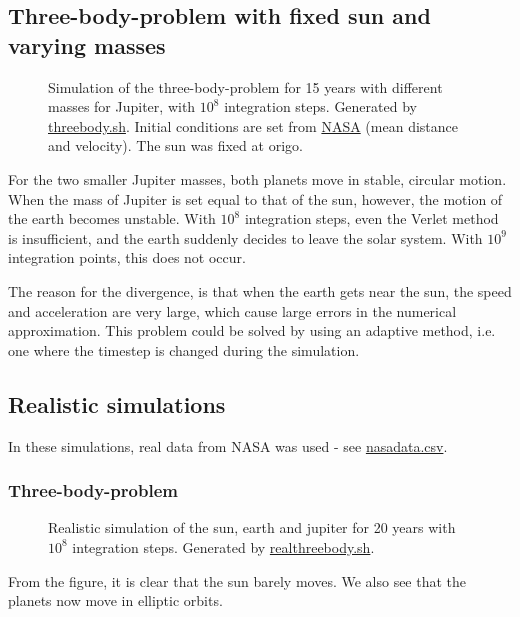 \documentclass[12pt,english,a4paper]{article}
\newcommand{\program}[1]{\href{https://github.com/anjohan/Offentlig/blob/master/FYS3150/Oblig3/#1}{#1}}
\begin{document}
\subsection{Three-body-problem with fixed sun and varying masses}
\begin{figure}[H]
\centering

\caption{Simulation of the three-body-problem for 15 years with different masses for Jupiter, with \(10^8\) integration steps. Generated by \program{threebody.sh}. Initial conditions are set from \href{http://nssdc.gsfc.nasa.gov/planetary/factsheet/jupiterfact.html}{NASA} (mean distance and velocity). The sun was fixed at origo.}
\end{figure}
For the two smaller Jupiter masses, both planets move in stable, circular motion. When the mass of Jupiter is set equal to that of the sun, however, the motion of the earth becomes unstable. With \(10^8\) integration steps, even the Verlet method is insufficient, and the earth suddenly decides to leave the solar system. With \(10^9\) integration points, this does not occur.

The reason for the divergence, is that when the earth gets near the sun, the speed and acceleration are very large, which cause large errors in the numerical approximation. This problem could be solved by using an adaptive method, i.e. one where the timestep is changed during the simulation.

\subsection{Realistic simulations}
In these simulations, real data from NASA was used - see \program{nasadata.csv}.

\subsubsection{Three-body-problem}
\begin{figure}[H]
\centering

\caption{Realistic simulation of the sun, earth and jupiter for 20 years with \(10^8\) integration steps. Generated by \program{realthreebody.sh}.}
\end{figure}
From the figure, it is clear that the sun barely moves. We also see that the planets now move in elliptic orbits.
\end{document}
